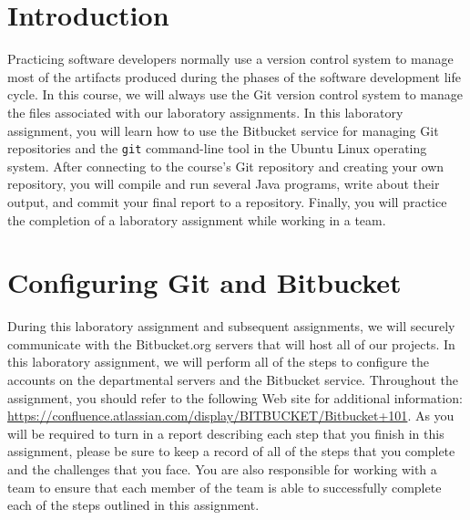 

\usepackage[compact]{titlesec}



\section*{Introduction}

Practicing software developers normally use a version control system to manage most of the artifacts produced during the
phases of the software development life cycle.  In this course, we will always use the Git version control system to
manage the files associated with our laboratory assignments.  In this laboratory assignment, you will learn how to use
the Bitbucket service for managing Git repositories and the {\tt git} command-line tool in the Ubuntu Linux operating
system. After connecting to the course's Git repository and creating your own repository, you will compile and run
several Java programs, write about their output, and commit your final report to a repository. Finally, you will
practice the completion of a laboratory assignment while working in a team.

\section*{Configuring Git and Bitbucket}

During this laboratory assignment and subsequent assignments, we will securely communicate with the Bitbucket.org
servers that will host all of our projects.  In this laboratory assignment, we will perform all of the steps to
configure the accounts on the departmental servers and the Bitbucket service.  Throughout the assignment, you should
refer to the following Web site for additional information:
\url{https://confluence.atlassian.com/display/BITBUCKET/Bitbucket+101}.  As you will be required to turn in a report
describing each step that you finish in this assignment, please be sure to keep a record of all of the steps that you
complete and the challenges that you face.  You are also responsible for working with a team to ensure that
each member of the team is able to successfully complete each of the steps outlined in this assignment.

